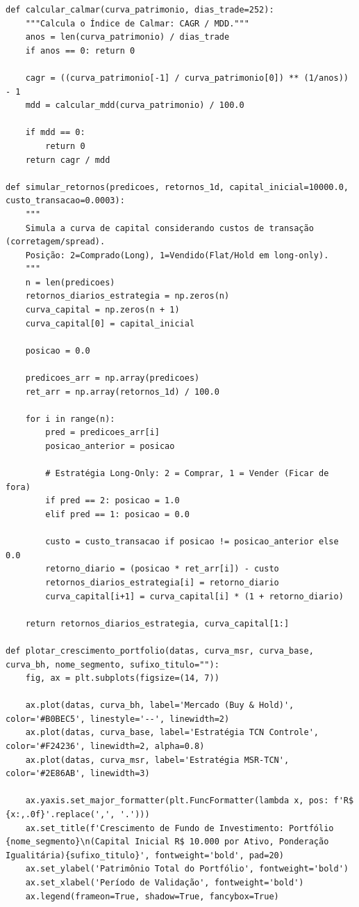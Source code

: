 \documentclass{article}
\begin{document}
\begin{verbatim}
def calcular_calmar(curva_patrimonio, dias_trade=252):
    """Calcula o Índice de Calmar: CAGR / MDD."""
    anos = len(curva_patrimonio) / dias_trade
    if anos == 0: return 0
    
    cagr = ((curva_patrimonio[-1] / curva_patrimonio[0]) ** (1/anos)) - 1
    mdd = calcular_mdd(curva_patrimonio) / 100.0  
    
    if mdd == 0:
        return 0
    return cagr / mdd

def simular_retornos(predicoes, retornos_1d, capital_inicial=10000.0, custo_transacao=0.0003):
    """
    Simula a curva de capital considerando custos de transação (corretagem/spread).
    Posição: 2=Comprado(Long), 1=Vendido(Flat/Hold em long-only).
    """
    n = len(predicoes)
    retornos_diarios_estrategia = np.zeros(n)
    curva_capital = np.zeros(n + 1)
    curva_capital[0] = capital_inicial
    
    posicao = 0.0  
    
    predicoes_arr = np.array(predicoes)
    ret_arr = np.array(retornos_1d) / 100.0
    
    for i in range(n):
        pred = predicoes_arr[i]
        posicao_anterior = posicao
        
        # Estratégia Long-Only: 2 = Comprar, 1 = Vender (Ficar de fora)
        if pred == 2: posicao = 1.0
        elif pred == 1: posicao = 0.0
        
        custo = custo_transacao if posicao != posicao_anterior else 0.0
        retorno_diario = (posicao * ret_arr[i]) - custo
        retornos_diarios_estrategia[i] = retorno_diario
        curva_capital[i+1] = curva_capital[i] * (1 + retorno_diario)
        
    return retornos_diarios_estrategia, curva_capital[1:]

def plotar_crescimento_portfolio(datas, curva_msr, curva_base, curva_bh, nome_segmento, sufixo_titulo=""):
    fig, ax = plt.subplots(figsize=(14, 7))
    
    ax.plot(datas, curva_bh, label='Mercado (Buy & Hold)', color='#B0BEC5', linestyle='--', linewidth=2)
    ax.plot(datas, curva_base, label='Estratégia TCN Controle', color='#F24236', linewidth=2, alpha=0.8)
    ax.plot(datas, curva_msr, label='Estratégia MSR-TCN', color='#2E86AB', linewidth=3)
    
    ax.yaxis.set_major_formatter(plt.FuncFormatter(lambda x, pos: f'R$ {x:,.0f}'.replace(',', '.')))
    ax.set_title(f'Crescimento de Fundo de Investimento: Portfólio {nome_segmento}\n(Capital Inicial R$ 10.000 por Ativo, Ponderação Igualitária){sufixo_titulo}', fontweight='bold', pad=20)
    ax.set_ylabel('Patrimônio Total do Portfólio', fontweight='bold')
    ax.set_xlabel('Período de Validação', fontweight='bold')
    ax.legend(frameon=True, shadow=True, fancybox=True)
    

\end{verbatim}
\end{document}
